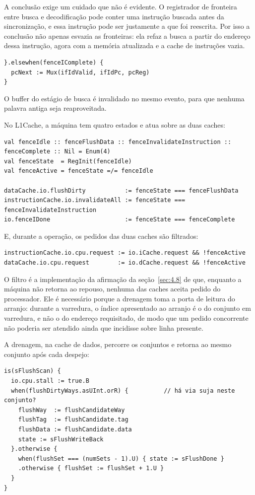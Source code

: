 A conclusão exige um cuidado que não é evidente. O registrador de fronteira entre busca e decodificação pode conter uma instrução buscada antes da sincronização, e essa instrução pode ser justamente a que foi reescrita. Por isso a conclusão não apenas esvazia as fronteiras: ela refaz a busca a partir do endereço dessa instrução, agora com a memória atualizada e a cache de instruções vazia.


{\footnotesize
\begin{verbatim}
}.elsewhen(fenceIComplete) {
  pcNext := Mux(ifIdValid, ifIdPc, pcReg)
}
\end{verbatim}
}


O buffer do estágio de busca é invalidado no mesmo evento, para que nenhuma palavra antiga seja reaproveitada.

No L1Cache, a máquina tem quatro estados e atua sobre as duas caches:


{\footnotesize
\begin{verbatim}
val fenceIdle :: fenceFlushData :: fenceInvalidateInstruction :: fenceComplete :: Nil = Enum(4)
val fenceState  = RegInit(fenceIdle)
val fenceActive = fenceState =/= fenceIdle

dataCache.io.flushDirty           := fenceState === fenceFlushData
instructionCache.io.invalidateAll := fenceState === fenceInvalidateInstruction
io.fenceIDone                     := fenceState === fenceComplete
\end{verbatim}
}


E, durante a operação, os pedidos das duas caches são filtrados:


{\footnotesize
\begin{verbatim}
instructionCache.io.cpu.request := io.iCache.request && !fenceActive
dataCache.io.cpu.request        := io.dCache.request && !fenceActive
\end{verbatim}
}


O filtro é a implementação da afirmação da seção~\ref{sec:4.8} de que, enquanto a máquina não retorna ao repouso, nenhuma das caches aceita pedido do processador. Ele é necessário porque a drenagem toma a porta de leitura do arranjo: durante a varredura, o índice apresentado ao arranjo é o do conjunto em varredura, e não o do endereço requisitado, de modo que um pedido concorrente não poderia ser atendido ainda que incidisse sobre linha presente.

A drenagem, na cache de dados, percorre os conjuntos e retorna ao mesmo conjunto após cada despejo:


{\footnotesize
\begin{verbatim}
is(sFlushScan) {
  io.cpu.stall := true.B
  when(flushDirtyWays.asUInt.orR) {          // há via suja neste conjunto?
    flushWay  := flushCandidateWay
    flushTag  := flushCandidate.tag
    flushData := flushCandidate.data
    state := sFlushWriteBack
  }.otherwise {
    when(flushSet === (numSets - 1).U) { state := sFlushDone }
    .otherwise { flushSet := flushSet + 1.U }
  }
}
\end{verbatim}
}


